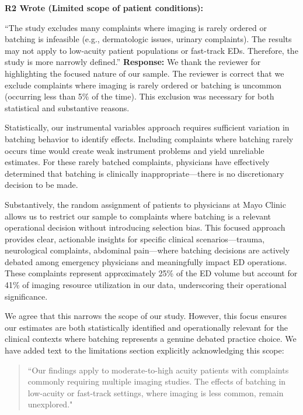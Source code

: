 \documentclass[11pt]{article}
\newenvironment{quote2}
{ \bigskip
\noindent
         \small\em
         \baselineskip=14pt
}
\newcommand{\1}{\hbox{\rm 1\kern-.35em 1}}
\begin{document}
{\color{black}



\begin{quote2}
\textbf{R2 Wrote (Limited scope of patient conditions):}  
 
\noindent``The study excludes many complaints where imaging is rarely ordered or batching is infeasible (e.g., dermatologic issues, urinary complaints). The results may not apply to low-acuity patient populations or fast-track EDs. Therefore, the study is more narrowly defined.” 
\end{quote2}

\noindent\textbf{Response:} \color{blue}We thank the reviewer for highlighting the focused nature of our sample. The reviewer is correct that we exclude complaints where imaging is rarely ordered or batching is uncommon (occurring less than 5\% of the time). This exclusion was necessary for both statistical and substantive reasons.

Statistically, our instrumental variables approach requires sufficient variation in batching behavior to identify effects. Including complaints where batching rarely occurs time would create weak instrument problems and yield unreliable estimates. For these rarely batched complaints, physicians have effectively determined that batching is clinically inappropriate—there is no discretionary decision to be made.

Substantively, the random assignment of patients to physicians at Mayo Clinic allows us to restrict our sample to complaints where batching is a relevant operational decision without introducing selection bias. This focused approach provides clear, actionable insights for specific clinical scenarios—trauma, neurological complaints, abdominal pain—where batching decisions are actively debated among emergency physicians and meaningfully impact ED operations. These complaints represent approximately 25\% of the ED volume but account for 41\% of imaging resource utilization in our data, underscoring their operational significance.

We agree that this narrows the scope of our study. However, this focus ensures our estimates are both statistically identified and operationally relevant for the clinical contexts where batching represents a genuine debated practice choice. We have added text to the limitations section explicitly acknowledging this scope:

\begin{quote}
``Our findings apply to moderate-to-high acuity patients with complaints commonly requiring multiple imaging studies. The effects of batching in low-acuity or fast-track settings, where imaging is less common, remain unexplored."
\end{quote}


}
\end{document}
